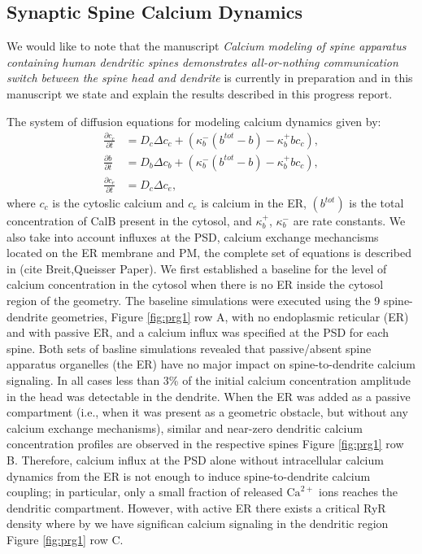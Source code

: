 \subsection*{Synaptic Spine Calcium Dynamics}
We would like to note that the manuscript \textit{Calcium modeling of spine apparatus containing human dendritic spines demonstrates all-or-nothing communication switch between the spine head and dendrite} is currently in preparation and in this manuscript we state and explain the results described in this progress report.

The system of diffusion equations for modeling calcium dynamics given by:
\begin{align}
    \frac{\partial c_c}{\partial t} &= D_c\Delta c_c + (\kappa_b^-(b^{tot}-b)-\kappa_b^+bc_c),\\
    \frac{\partial b}{\partial t} &= D_b\Delta c_b + (\kappa_b^-(b^{tot}-b)-\kappa_b^+bc_c),\\
    \frac{\partial c_e}{\partial t} &= D_c\Delta c_e, 
\end{align}
where $c_c$ is the cytoslic calcium and $c_e$ is calcium in the ER, $(b^{tot})$ is the total concentration of CalB present in the cytosol, and $\kappa_b^+$, $\kappa_b^-$ are rate constants. We also take into account influxes at the PSD, calcium exchange mechancisms located on the ER membrane and PM, the complete set of equations is described in (cite Breit,Queisser Paper). We first established a baseline for the level of calcium concentration in the cytosol when there is no ER inside the cytosol region of the geometry. The baseline simulations were executed using the 9 spine-dendrite geometries,  Figure \ref{fig:prg1} row A, with no endoplasmic reticular (ER) and with passive ER, and a calcium influx was specified at the PSD for each spine. Both sets of basline simulations revealed that passive/absent spine apparatus organelles (the ER) have no major impact on spine-to-dendrite calcium signaling. In all cases less than 3\%  of the initial calcium concentration amplitude in the head was detectable in the dendrite. When the ER was added as a passive compartment (i.e., when it was present as a geometric obstacle, but without any calcium exchange mechanisms), similar and near-zero dendritic calcium concentration profiles are observed in the respective spines Figure \ref{fig:prg1} row B. Therefore, calcium influx at the PSD alone without intracellular calcium dynamics from the ER is not enough to induce spine-to-dendrite calcium coupling; in particular, only a small fraction of released $\textrm{Ca}^{2+}$ ions reaches the dendritic compartment. However, with active ER there exists a critical RyR density where by we have significan calcium signaling in the dendritic region Figure \ref{fig:prg1} row C.

